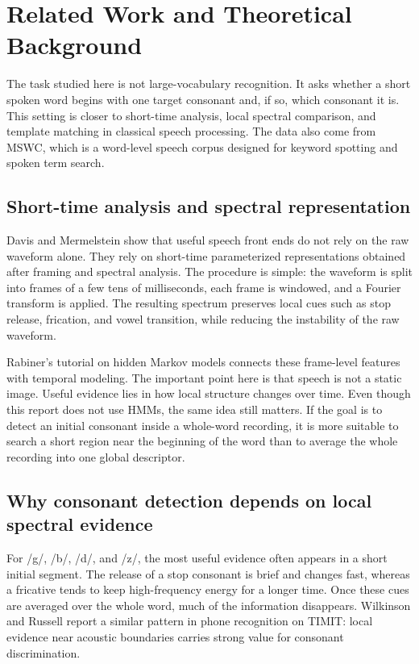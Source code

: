 \section{Related Work and Theoretical Background}

The task studied here is not large-vocabulary recognition. It asks whether a short spoken word begins with one target consonant and, if so, which consonant it is. This setting is closer to short-time analysis, local spectral comparison, and template matching in classical speech processing. The data also come from MSWC, which is a word-level speech corpus designed for keyword spotting and spoken term search\cite{mazumder2021mswc}.

\subsection{Short-time analysis and spectral representation}

Davis and Mermelstein show that useful speech front ends do not rely on the raw waveform alone. They rely on short-time parameterized representations obtained after framing and spectral analysis\cite{davis1980}. The procedure is simple: the waveform is split into frames of a few tens of milliseconds, each frame is windowed, and a Fourier transform is applied. The resulting spectrum preserves local cues such as stop release, frication, and vowel transition, while reducing the instability of the raw waveform.

Rabiner's tutorial on hidden Markov models connects these frame-level features with temporal modeling\cite{rabiner1989}. The important point here is that speech is not a static image. Useful evidence lies in how local structure changes over time. Even though this report does not use HMMs, the same idea still matters. If the goal is to detect an initial consonant inside a whole-word recording, it is more suitable to search a short region near the beginning of the word than to average the whole recording into one global descriptor.

\subsection{Why consonant detection depends on local spectral evidence}

For /g/, /b/, /d/, and /z/, the most useful evidence often appears in a short initial segment. The release of a stop consonant is brief and changes fast, whereas a fricative tends to keep high-frequency energy for a longer time. Once these cues are averaged over the whole word, much of the information disappears. Wilkinson and Russell report a similar pattern in phone recognition on TIMIT: local evidence near acoustic boundaries carries strong value for consonant discrimination\cite{wilkinson2002}.

